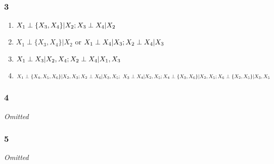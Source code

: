 \documentclass[11pt]{article}
\begin{document}
\begin{figure}[H]
\centering
\end{figure}

\subsubsection{3}

\begin{enumerate}[label=(\alph*)]
    \item $X_1 \perp \{X_3, X_4\} | X_2; \\
    X_3 \perp X_4 | X_2$
    \item $X_1 \perp \{X_3, X_4\} | X_2$ or $X_1 \perp X_4 | X_3; \\ 
    X_2 \perp X_4 | X_3$
    \item $X_1 \perp X_3 | X_2, X_4; \\ 
    X_2 \perp X_4 | X_1, X_3$
    \item $X_1 \perp \{X_4, X_5, X_6\} | X_2, X_3; \\ 
    X_2 \perp X_6 | X_3, X_5; \ X_3 \perp X_4 | X_2, X_5; \\ 
    X_4 \perp \{X_3,X_6\} | X_2, X_5; \\ 
    X_6 \perp \{X_2, X_5\} | X_3, X_5$
\end{enumerate}

\subsubsection{4}
\textit{Omitted }


    \iffalse 
        Consider $X_i \sim \text{Bernoulli}(p_i), i \in [3]$. Define $\Psymb(X_i=1, X_j=1) = p_{ij}$, noting that $X_i \perp X_j \Rightarrow p_{ij} = p_i p_j$. Under $H_0: p_{12|3} = p_{1|3}p_{2|3}$ and under $H_A: p_{12|3} \not=  p_{1|3}p_{2|3}$. 
        
        \begin{align*}
            \lambda 
            &= 
            \frac{
            \Psymb(X_1 = x_1 | X_3)
            \Psymb(X_2 = x_2 | X_3)
            }{
            \Psymb(X_1 = x_1, X_2 = x_2 | X_3)
            }
            \\
            &=
            \frac{
            p_{1|3}^{x_1} (1-p_{1|3})^{1-x_1}
            p_{2|3}^{x_2} (1-p_{2|3})^{1-x_2}
            }{
            asdf
            }
        \end{align*}
    \fi 

\subsubsection{5}
\textit{Omitted}
\end{document}
